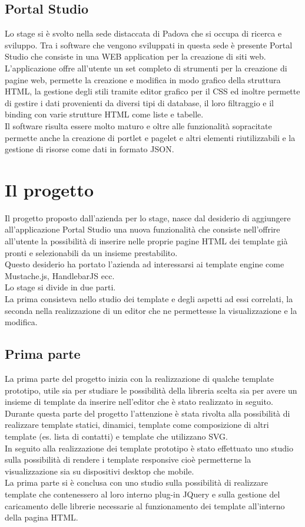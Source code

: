 \subsection{Portal Studio}
Lo stage si è svolto nella sede distaccata di Padova che si occupa di ricerca e sviluppo.
Tra i software che vengono sviluppati in questa sede è presente Portal Studio che consiste in una WEB application per la creazione di siti web.\\
L'applicazione offre all'utente un set completo di strumenti per la creazione di pagine web, permette la creazione e modifica in modo grafico della struttura HTML, la gestione degli stili tramite editor grafico per il CSS ed inoltre permette di gestire i dati provenienti da diversi tipi di database, il loro filtraggio e il binding con varie strutture HTML come liste e tabelle.\\
Il software risulta essere molto maturo e oltre alle funzionalità sopracitate permette anche la creazione di portlet e pagelet e altri elementi riutilizzabili e la gestione di risorse come dati in formato JSON.


\section{Il progetto}
Il progetto proposto dall'azienda per lo stage, nasce dal desiderio di aggiungere all'applicazione Portal Studio una nuova funzionalità che consiste nell'offrire all'utente la possibilità di inserire nelle proprie pagine HTML dei template già pronti e selezionabili da un insieme prestabilito.\\
Questo desiderio ha portato l'azienda ad interessarsi ai template engine come Mustache.js, HandlebarJS ecc.\\
Lo stage si divide in due parti.\\
La prima consisteva nello studio dei template e degli aspetti ad essi correlati, la seconda nella realizzazione di un editor che ne permettesse la visualizzazione e la modifica.
\subsection{Prima parte}
La prima parte del progetto inizia con la realizzazione di qualche template prototipo, utile sia per studiare le possibilità della libreria scelta sia per avere un insieme di template da inserire nell'editor che è stato realizzato in seguito.\\
Durante questa parte del progetto l'attenzione è stata rivolta alla possibilità di realizzare template statici, dinamici, template come composizione di altri template (es. lista di contatti) e template che utilizzano SVG.\\
In seguito alla realizzazione dei template prototipo è stato effettuato uno studio sulla possibilità di rendere i template responsive cioè permetterne la visualizzazione sia su dispositivi desktop che mobile.\\
La prima parte si è conclusa con uno studio sulla possibilità di realizzare template che contenessero al loro interno plug-in JQuery e sulla gestione del caricamento delle librerie necessarie al funzionamento dei template all'interno della pagina HTML.
